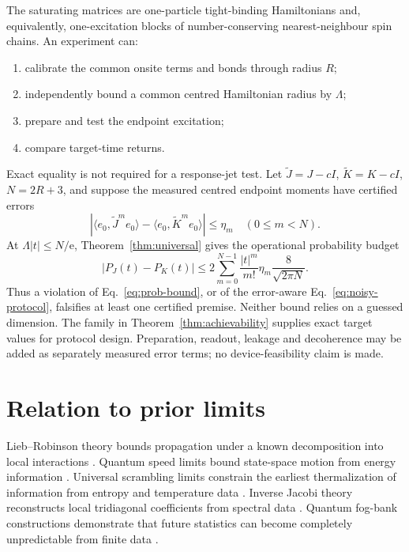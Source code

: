 \documentclass[10pt]{article}
\numberwithin{equation}{section}
\theoremstyle{definition}
\theoremstyle{remark}
\newcommand{\ee}{\mathrm e}
\newcommand{\ip}[2]{\langle #1,#2\rangle}
\begin{document}
The saturating matrices are one-particle tight-binding Hamiltonians and,
equivalently, one-excitation blocks of number-conserving nearest-neighbour
spin chains.  An experiment can:
\begin{enumerate}
\item calibrate the common onsite terms and bonds through radius \(R\);
\item independently bound a common centred Hamiltonian radius by
\(\Lambda\);
\item prepare and test the endpoint excitation;
\item compare target-time returns.
\end{enumerate}
Exact equality is not required for a response-jet test.  Let
\(\widetilde J=J-cI\), \(\widetilde K=K-cI\), \(N=2R+3\), and suppose the
measured centred endpoint moments have certified errors
\[
 \left|\ip{e_0}{\widetilde J^m e_0}
 -\ip{e_0}{\widetilde K^m e_0}\right|\le\eta_m
 \quad(0\le m<N).
\]
At \(\Lambda|t|\le N/\ee\), Theorem~\ref{thm:universal} gives the
operational probability budget
\begin{equation}
 |P_J(t)-P_K(t)|
 \le
 2\sum_{m=0}^{N-1}\frac{|t|^m}{m!}\eta_m
 \frac{8}{\sqrt{2\pi N}}.
\label{eq:noisy-protocol}
\end{equation}
Thus a violation of Eq.~\eqref{eq:prob-bound}, or of the error-aware
Eq.~\eqref{eq:noisy-protocol}, falsifies at least one certified premise.
Neither bound relies on a guessed dimension.  The family in
Theorem~\ref{thm:achievability} supplies exact target values for protocol
design.  Preparation, readout, leakage and decoherence may be added as
separately measured error terms; no device-feasibility claim is made.

\section{Relation to prior limits}

Lieb--Robinson theory bounds propagation under a known decomposition into
local interactions \cite{LiebRobinson1972}.  Quantum speed limits bound
state-space motion from energy information
\cite{MandelstamTamm1945,MargolusLevitin1998,NessEtAl2022}.
Universal scrambling limits constrain the earliest thermalization of
information from entropy and temperature data \cite{VikramShouGalitski2026}.
Inverse Jacobi theory reconstructs local tridiagonal coefficients from
spectral data \cite{GesztesySimon1997,SimonOPRL}.  Quantum fog-bank
constructions demonstrate that future statistics can become completely
unpredictable from finite data
\cite{ManosWeilenmannNavascues2026}.
\end{document}
